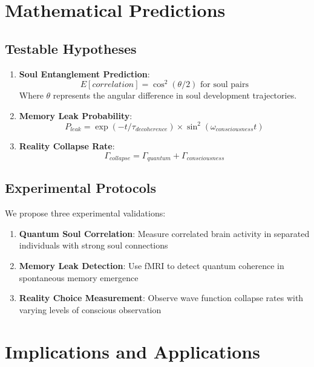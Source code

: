 \documentclass[12pt,a4paper]{article}
\begin{document}
\section{Mathematical Predictions}

\subsection{Testable Hypotheses}
\begin{enumerate}
\item \textbf{Soul Entanglement Prediction}: 
\begin{equation}
E[correlation] = \cos^2(\theta/2) \text{ for soul pairs}
\end{equation}
Where $\theta$ represents the angular difference in soul development trajectories.

\item \textbf{Memory Leak Probability}:
\begin{equation}
P_{leak} = \exp(-t/\tau_{decoherence}) \times \sin^2(\omega_{consciousness} t)
\end{equation}

\item \textbf{Reality Collapse Rate}:
\begin{equation}
\Gamma_{collapse} = \Gamma_{quantum} + \Gamma_{consciousness}
\end{equation}
\end{enumerate}

\subsection{Experimental Protocols}
We propose three experimental validations:
\begin{enumerate}
\item \textbf{Quantum Soul Correlation}: Measure correlated brain activity in separated individuals with strong soul connections
\item \textbf{Memory Leak Detection}: Use fMRI to detect quantum coherence in spontaneous memory emergence
\item \textbf{Reality Choice Measurement}: Observe wave function collapse rates with varying levels of conscious observation
\end{enumerate}

\section{Implications and Applications}
\end{document}
